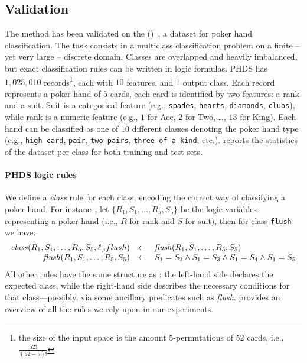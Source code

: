 \subsection{Validation}\label{subsec:kill-validation}
%

%
The method has been validated on the  ()~\cite{poker_hand_158}, a dataset for poker hand classification.
%
The task consists in a multiclass classification problem on a finite -- yet very large -- discrete domain.
%
Classes are overlapped and heavily imbalanced, but exact classification rules can be written in logic formulas.
%
\Gls{PHDS} has $1,025,010$ records\footnote{the size of the input space is the amount 5-permutations of 52 cards, i.e., $\frac{52!}{(52 - 5)!}$}, each with $10$ features, and $1$ output class.
%
Each record represents a poker hand of $5$ cards, each card is identified by two features: a rank and a suit.
%
Suit is a categorical feature (e.g., \texttt{spades}, \texttt{hearts}, \texttt{diamonds}, \texttt{clubs}), while rank is a numeric feature (e.g., $1$ for Ace, $2$ for Two, \dots, $13$ for King).
%
Each hand can be classified as one of $10$ different classes denoting the poker hand type (e.g., \texttt{high card}, \texttt{pair}, \texttt{two pairs}, \texttt{three of a kind}, etc.).
%
 reports the statistics of the dataset per class for both training and test sets.


\paragraph{\Gls{PHDS} logic rules}\label{par:phds-logic-rules}
%

%
We define a \emph{class} rule for each class, encoding the correct way of classifying a poker hand.
%
For instance, let $\{R_{1}, S_{1}, \dots, R_{5}, S_{5}\}$ be the logic variables representing a poker hand (i.e., $R$ for rank and $S$ for suit), then for class \texttt{flush} we have:
%
\begin{equation}\label{eq:flush-class}
     \begin{array}{rcl}
        \mathit{class}(R_1, S_1, \ldots, R_5, S_5, \ell_{\varphi}{flush}) & \leftarrow & \mathit{flush}(R_1, S_1, \ldots, R_5, S_5)
        \\
        \mathit{flush}(R_1, S_1, \ldots, R_5, S_5) & \leftarrow & S_1 = S_2 \wedge S_1 = S_3 \wedge S_1 = S_4 \wedge S_1 = S_5
    \end{array}
\end{equation}
%
All other rules have the same structure as : the left-hand side declares the expected class, while the right-hand side describes the necessary conditions for that class—possibly, via some ancillary predicates such as \emph{flush}.
%
 provides an overview of all the rules we rely upon in our experiments.


